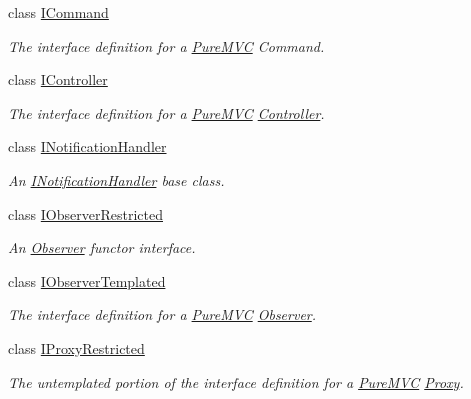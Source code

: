 \begin{DoxyCompactItemize}
class \hyperlink{class_pure_m_v_c_1_1_i_command}{ICommand}
\begin{DoxyCompactList}\small\item\em The interface definition for a \hyperlink{namespace_pure_m_v_c}{PureMVC} Command. \item\end{DoxyCompactList}\item 
class \hyperlink{class_pure_m_v_c_1_1_i_controller}{IController}
\begin{DoxyCompactList}\small\item\em The interface definition for a \hyperlink{namespace_pure_m_v_c}{PureMVC} \hyperlink{class_pure_m_v_c_1_1_controller}{Controller}. \item\end{DoxyCompactList}\item 
class \hyperlink{class_pure_m_v_c_1_1_i_notification_handler}{INotificationHandler}
\begin{DoxyCompactList}\small\item\em An \hyperlink{class_pure_m_v_c_1_1_i_notification_handler}{INotificationHandler} base class. \item\end{DoxyCompactList}\item 
class \hyperlink{class_pure_m_v_c_1_1_i_observer_restricted}{IObserverRestricted}
\begin{DoxyCompactList}\small\item\em An \hyperlink{class_pure_m_v_c_1_1_observer}{Observer} functor interface. \item\end{DoxyCompactList}\item 
class \hyperlink{class_pure_m_v_c_1_1_i_observer_templated}{IObserverTemplated}
\begin{DoxyCompactList}\small\item\em The interface definition for a \hyperlink{namespace_pure_m_v_c}{PureMVC} \hyperlink{class_pure_m_v_c_1_1_observer}{Observer}. \item\end{DoxyCompactList}\item 
class \hyperlink{class_pure_m_v_c_1_1_i_proxy_restricted}{IProxyRestricted}
\begin{DoxyCompactList}\small\item\em The untemplated portion of the interface definition for a \hyperlink{namespace_pure_m_v_c}{PureMVC} \hyperlink{class_pure_m_v_c_1_1_proxy}{Proxy}. \item\end{DoxyCompactList}\item 

\end{DoxyCompactItemize}
